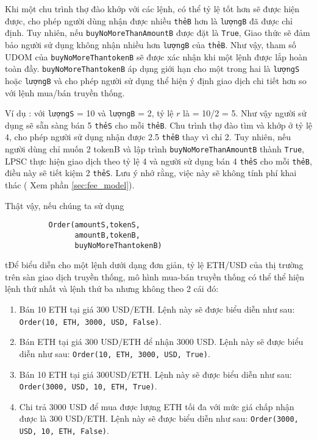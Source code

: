 \documentclass{article}
\begin{document}
\begin{multicols}{2}
Khi một chu trình thợ đào khớp với các lệnh, có thể tỷ lệ tốt hơn sẽ được hiện được, cho phép người dùng nhận được nhiều \verb|thẻB| hơn là \verb|lượngB| đã được chỉ định. Tuy nhiên, nếu \verb|buyNoMoreThanAmountB| được đặt là \verb|True|, Giao thức sẽ đảm bảo người sử dụng không nhận nhiều hơn \verb|lượngB| của \verb|thẻB|. Như vậy, tham số UDOM của \verb|buyNoMoreThantokenB|  sẽ được xác nhận khi một lệnh được lắp hoàn toàn đầy. \verb|buyNoMoreThantokenB| áp dụng giới hạn cho một trong hai là \verb|lượngS| hoặc \verb|lượngB| và cho phép người sử dụng thể hiện ý định giao dịch chi tiết hơn so với lệnh mua/bán truyền thống.

Ví dụ : với \verb|lượngS| = 10 và \verb|lượngB| = 2, tỷ lệ $r$ là = 10/2 = 5. Như vậy người sử dụng sẽ sẵn sàng bán 5 \verb|thẻS| cho mỗi \verb|thẻB|. Chu trình thợ đào tìm và khớp ở tỷ lệ 4, cho phép người sử dụng nhận được 2.5 \verb|thẻB| thay vì chỉ 2. Tuy nhiên, nếu người dùng chỉ muốn 2 tokenB và lập trình \verb|buyNoMoreThanAmountB| thành \verb|True|, LPSC thực hiện giao dịch theo tỷ lệ 4 và người sử dụng bán 4 \verb|thẻS| cho mỗi \verb|thẻB|, điều này sẽ tiết kiệm 2 \verb|thẻS|. Lưu ý nhớ rằng, việc này sẽ không tính phí khai thác ( Xem phần \ref{sec:fee_model}).

Thật vậy, nếu chúng ta sử dụng 


\begin{verbatim}
	      Order(amountS,tokenS,
	            amountB,tokenB,
	            buyNoMoreThantokenB)
\end{verbatim}

tĐể biểu diễn cho một lệnh dưới dạng đơn giản, tỷ lệ ETH/USD của thị trường trên sàn giao dịch truyền thống, mô hình mua-bán truyền thống có thể thể hiện lệnh thứ nhất và lệnh thứ ba nhưng không theo 2 cái đó:

\begin{enumerate}
	\item Bán 10 ETH tại giá 300 USD/ETH. Lệnh này sẽ được biểu diễn như sau: \verb|Order(10, ETH, 3000, USD, False)|.
	\item Bán ETH tại giá 300 USD/ETH để nhận 3000 USD. Lệnh này sẽ được biểu diễn như sau: \verb|Order(10, ETH, 3000, USD, True)|.
	\item Bán 10 ETH tại giá 300USD/ETH. Lệnh này sẽ được biểu diễn như sau: \verb|Order(3000, USD, 10, ETH, True)|.
	\item Chi trả 3000 USD để mua được lượng ETH tối đa với mức giá chấp nhận được là 300 USD/ETH. Lệnh này sẽ được biểu diễn như sau: \verb|Order(3000, USD, 10, ETH, False)|.
\end{enumerate}




\end{multicols}
\end{document}
